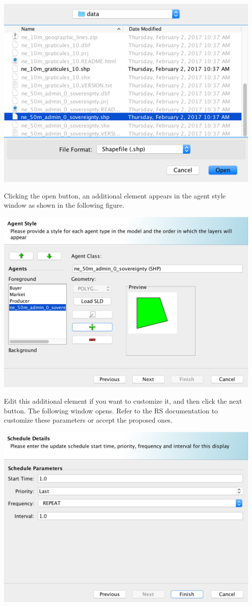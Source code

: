 \documentclass{article}
\begin{document}
\includegraphics[scale=0.35]{fig_cms_rs_gis6}

Clicking the open button, an additional element appears in the agent style window as shown in the following figure.

\includegraphics[scale=0.35]{fig_cms_rs_gis7}

Edit this additional element if you want to customize it, and then click the next button. The following window opens. Refer to the RS documentation to customize these parameters or accept the proposed ones.

\includegraphics[scale=0.35]{fig_cms_rs_gis8}
\end{document}
